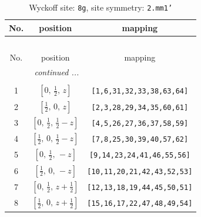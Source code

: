\documentclass[fleqn,8pt]{jsarticle}
\begin{document}
\begin{longtable}{ccc}
\caption{Wyckoff site: {\tt 8g}, site symmetry: {\tt 2.mm1'}}
 \\
 \hline \hline
No. & position & mapping \\ \hline \endfirsthead

\multicolumn{2}{l}{\tablename\ \thetable{}} \\
 \hline \hline
No. & position & mapping \\ \hline \endhead

 \hline \hline
\multicolumn{2}{r}{\footnotesize\it continued ...} \\ \endfoot

 \hline \hline
\multicolumn{2}{r}{} \\ \endlastfoot

1 & $\left[ 0,\, \frac{1}{2},\, z \right]$ & {\tt [1,6,31,32,33,38,63,64]} \\ \hline
2 & $\left[ \frac{1}{2},\, 0,\, z \right]$ & {\tt [2,3,28,29,34,35,60,61]} \\ \hline
3 & $\left[ 0,\, \frac{1}{2},\, \frac{1}{2} - z \right]$ & {\tt [4,5,26,27,36,37,58,59]} \\ \hline
4 & $\left[ \frac{1}{2},\, 0,\, \frac{1}{2} - z \right]$ & {\tt [7,8,25,30,39,40,57,62]} \\ \hline
5 & $\left[ 0,\, \frac{1}{2},\, - z \right]$ & {\tt [9,14,23,24,41,46,55,56]} \\ \hline
6 & $\left[ \frac{1}{2},\, 0,\, - z \right]$ & {\tt [10,11,20,21,42,43,52,53]} \\ \hline
7 & $\left[ 0,\, \frac{1}{2},\, z + \frac{1}{2} \right]$ & {\tt [12,13,18,19,44,45,50,51]} \\ \hline
8 & $\left[ \frac{1}{2},\, 0,\, z + \frac{1}{2} \right]$ & {\tt [15,16,17,22,47,48,49,54]} \\
\end{longtable}
\renewcommand{\arraystretch}{1.2}
\end{document}
